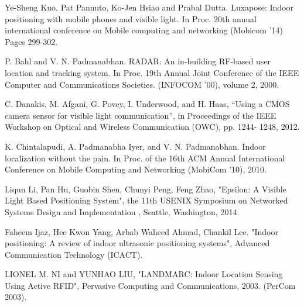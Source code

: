 \documentclass[conference]{IEEEtran}
\begin{document}
%
%
%
\begin{thebibliography}{1}

Ye-Sheng Kuo, Pat Pannuto, Ko-Jen Hsiao and Prabal Dutta. Luxapose: Indoor positioning with mobile phones and visible light. In Proc. 20th annual international conference on Mobile computing and networking (Mobicom ’14)
Pages 299-302.

P. Bahl and V. N. Padmanabhan. RADAR: An in-building
RF-based user location and tracking system. In Proc. 19th
Annual Joint Conference of the IEEE Computer and
Communications Societies. (INFOCOM ’00), volume 2, 2000.

C. Danakis, M. Afgani, G. Povey, I. Underwood, and H. Haas, “Using a CMOS camera sensor for visible light
communication”, in Proceedings of the IEEE Workshop on Optical and Wireless Communication (OWC), pp. 1244-
1248, 2012.

K. Chintalapudi, A. Padmanabha Iyer, and V. N.
Padmanabhan. Indoor localization without the pain. In Proc.
of the 16th ACM Annual International Conference on Mobile
Computing and Networking (MobiCom ’10), 2010.



Liqun Li, Pan Hu, Guobin Shen, Chunyi Peng, Feng Zhao, "Epsilon: A Visible Light Based Positioning System", the 11th USENIX Symposium on Networked Systems Design and Implementation , Seattle, Washington, 2014.

Faheem Ijaz, Hee Kwon Yang, Arbab Waheed Ahmad, Chankil Lee. "Indoor positioning: A review of indoor ultrasonic positioning systems", Advanced Communication Technology (ICACT).


LIONEL M. NI and YUNHAO LIU, "LANDMARC: Indoor Location Sensing Using Active RFID", Pervasive Computing and Communications, 2003. (PerCom 2003).


\end{thebibliography}
\end{document}

